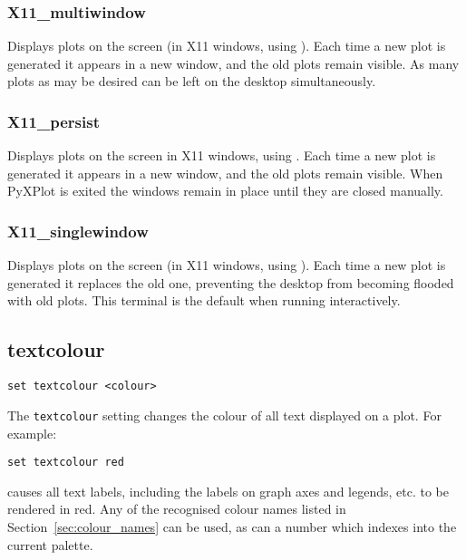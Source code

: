 \subsubsection{X11\_multiwindow}

Displays plots on the screen (in X11 windows, using \ghostview). Each time a new
plot is generated it appears in a new window, and the old plots remain visible.
As many plots as may be desired can be left on the desktop simultaneously.

\subsubsection{X11\_persist}

Displays plots on the screen in X11 windows, using \ghostview.  Each time a new
plot is generated it appears in a new window, and the old plots remain visible.
When PyXPlot is exited the windows remain in place until they are closed
manually.

\subsubsection{X11\_singlewindow}

Displays plots on the screen (in X11 windows, using \ghostview). Each time a new
plot is generated it replaces the old one, preventing the desktop from becoming
flooded with old plots. This terminal is the default when running
interactively.

\subsection{textcolour}

\begin{verbatim}
set textcolour <colour>
\end{verbatim}

The {\tt textcolour} setting changes the colour of all text displayed on a plot.
For example:

\begin{verbatim}
set textcolour red
\end{verbatim}

\noindent causes all text labels, including the labels on graph axes and
legends, etc. to be rendered in red. Any of the recognised colour names listed
in Section~\ref{sec:colour_names} can be used, as can a number which indexes
into the current palette.

